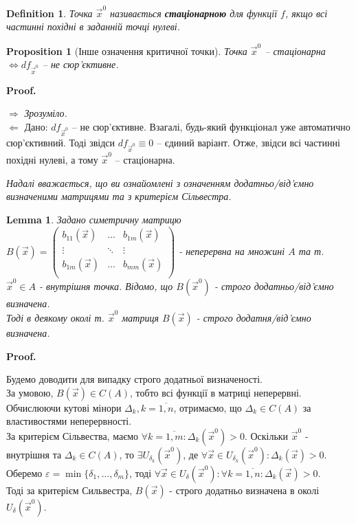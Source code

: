 \documentclass[a4paper, 10pt]{article}
\makeatletter
\def\qed{$\blacksquare$}
\def\rightproof{$\boxed{\Rightarrow}$ }
\def\leftproof{$\boxed{\Leftarrow}$ }
\theoremstyle{theoremdd}
\theoremstyle{theoremdd}
\theoremstyle{theoremdd}
\newtheorem{definition}[theorem]{Definition}
\theoremstyle{theoremdd}
\theoremstyle{theoremdd}
\theoremstyle{theoremdd}
\newtheorem{proposition}[theorem]{Proposition}
\theoremstyle{theoremdd}
\theoremstyle{theoremdd}
\newtheorem{lemma}[theorem]{Lemma}
\theoremstyle{theoremdd}
\renewenvironment{proof}[1][Proof.\\]{\par
\pushQED{\hfill \qed}%
\normalfont \topsep6\p@\@plus6\p@\relax
\trivlist
\item\relax
{\bfseries
#1\@addpunct{.}}\hspace\labelsep\ignorespaces
}{%
\popQED\endtrivlist\@endpefalse
}
\makeatother
\begin{document}
\begin{definition}
Точка $\vec{x}^0$ називається \textbf{стаціонарною} для функції $f$, якщо всі частинні похідні в заданній точці нулеві.
\end{definition}

\begin{proposition}[Інше означення критичної точки]
Точка $\vec{x}^0$ -- стаціонарна $\iff df_{\vec{x}^0}$ -- не сюр'єктивне.
\end{proposition}

\begin{proof}
\rightproof \textit{Зрозуміло.}
\bigskip \\
\leftproof Дано: $ df_{\vec{x}^0}$ -- не сюр'єктивне. Взагалі, будь-який функціонал уже автоматично сюр'єктивний. Тоді звідси $ df_{\vec{x}^0} \equiv 0$ -- єдиний варіант. Отже, звідси всі частинні похідні нулеві, а тому $\vec{x}^0$ -- стаціонарна.
\end{proof}

\iffalse
\textit{Надалі вважається, що ви ознайомлені з означенням додатньо/від'ємно визначеними матрицями та з критерієм Сільвестра.}

\begin{lemma}
Задано симетричну матрицю $B(\vec{x}) = \begin{pmatrix}
b_{11}(\vec{x}) & \dots & b_{1m}(\vec{x}) \\
\vdots & \ddots & \vdots \\
b_{1m}(\vec{x}) & \dots & b_{mm}(\vec{x}) \\
\end{pmatrix}$ - неперервна на множині $A$ та т. $\vec{x}^0 \in A$ - внутрішня точка. Відомо, що $B(\vec{x}^0)$ - строго додатньо/від'ємно визначена. \\ Тоді в деякому околі т. $\vec{x}^0$ матриця $B(\vec{x})$ - строго додатня/від'ємно визначена.
\end{lemma}

\begin{proof}
Будемо доводити для випадку строго додатньої визначеності.\\
За умовою, $B(\vec{x}) \in C(A)$, тобто всі функції в матриці неперервні. Обчислюючи кутові мінори $\Delta_k, k = \overline{1,n}$, отримаємо, що $\Delta_k \in C(A)$ за властивостями неперервності.\\
За критерієм Сільвества, маємо $\forall k = \overline{1,m}: \Delta_k (\vec{x}^0) > 0$. Оскільки $\vec{x}^0$ - внутрішня та $\Delta_k \in C(A)$, то $\exists U_{\delta_k}(\vec{x}^0)$, де $\forall \vec{x} \in U_{\delta_k}(\vec{x}^0): \Delta_k(\vec{x}) > 0$.\\
Оберемо $\varepsilon = \min \{\delta_1, \dots, \delta_m \}$, тоді $\forall \vec{x} \in U_{\delta}(\vec{x}^0): \forall k = \overline{1,n}: \Delta_k(\vec{x}) > 0$.\\
Тоді за критерієм Сильвестра, $B(\vec{x})$ - строго додатньо визначена в околі $U_\delta (\vec{x}^0)$.
\end{proof}
\end{document}

